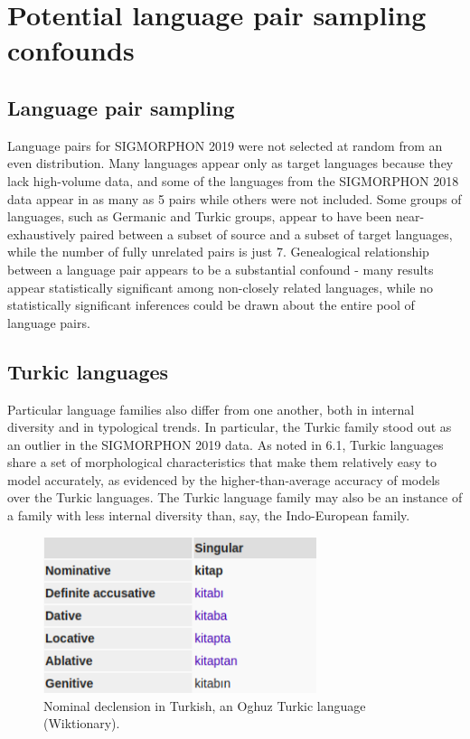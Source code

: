 
\section{Potential language pair sampling confounds}

\subsection{Language pair sampling}

Language pairs for SIGMORPHON 2019 were not selected at random from an even distribution. Many languages appear only as target languages because they lack high-volume data, and some of the languages from the SIGMORPHON 2018 data appear in as many as 5 pairs while others were not included. Some groups of languages, such as Germanic and Turkic groups, appear to have been near-exhaustively paired between a subset of source and a subset of target languages, while the number of fully unrelated pairs is just 7. Genealogical relationship between a language pair appears to be a substantial confound - many results appear statistically significant among non-closely related languages, while no statistically significant inferences could be drawn about the entire pool of language pairs.

\subsection{Turkic languages}

Particular language families also differ from one another, both in internal diversity and in typological trends. In particular, the Turkic family stood out as an outlier in the SIGMORPHON 2019 data. As noted in 6.1, Turkic languages share a set of morphological characteristics that make them relatively easy to model accurately, as evidenced by the higher-than-average accuracy of models over the Turkic languages. The Turkic language family may also be an instance of a family with less internal diversity than, say, the Indo-European family. 

\begin{figure}[ht]
\includegraphics[width=8cm]{images/Turkish_kitap.png}
\centering
\caption{Nominal declension in Turkish, an Oghuz Turkic language (Wiktionary).}
\end{figure}

